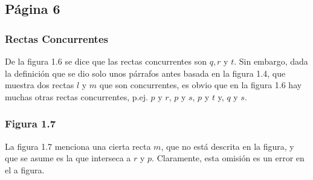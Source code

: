

\subsection{Página 6}

\subsubsection{Rectas Concurrentes}

De la figura 1.6 se dice que las rectas concurrentes son $q,r$ y $t$. Sin embargo, dada la definición que se dio solo unos párrafos antes basada en la figura 1.4, que muestra dos rectas $l$ y $m$ que son concurrentes, es obvio que en la figura 1.6 hay muchas otras rectas concurrentes, p.ej. $p$ y $r$, $p$ y $s$, $p$ y $t$ y, $q$ y $s$.

\subsubsection{Figura 1.7}

La figura 1.7 menciona una cierta recta $m$, que no está descrita en la figura, y que se asume es la que interseca a $r$ y $p$. Claramente, esta omisión es un error en el a figura.





